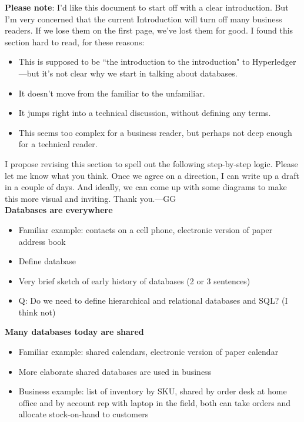 \textbf{Please note}: I'd like this document to start off with a clear introduction. 
But I'm very concerned that the current Introduction will turn off many business readers.
If we lose them on the first page, we've lost them for good. 
I found this section hard to read, for these reasons:
\begin{itemize}
\item This is supposed to be ``the introduction to the introduction" to Hyperledger---but it's not clear why we start in talking about databases. 
\item It doesn't move from the familiar to the unfamiliar. 
\item It jumps right into a technical discussion, without defining any terms. 
\item This seems too complex for a business reader, but perhaps not deep enough for a technical reader.
\end{itemize} 

I propose revising this section to spell out the following step-by-step logic. 
Please let me know what you think.
Once we agree on a direction, I can write up a draft in a couple of days.
And ideally, we can come up with some diagrams to make this more visual and inviting.
Thank you.---GG\\

\textbf{Databases are everywhere}
\begin{itemize}
\item Familiar example: contacts on a cell phone, electronic version of paper address book
\item Define database
\item Very brief sketch of early history of databases (2 or 3 sentences)
\item Q: Do we need to define hierarchical and relational databases and SQL? (I think not)
\end{itemize}

\textbf{Many databases today are shared}
\begin{itemize}
\item Familiar example: shared calendars, electronic version of paper calendar
\item More elaborate shared databases are used in business
\item Business example: list of inventory by SKU, shared by order desk at home office and by account rep with laptop in the field, both can take orders and allocate stock-on-hand to customers
\end{itemize}

